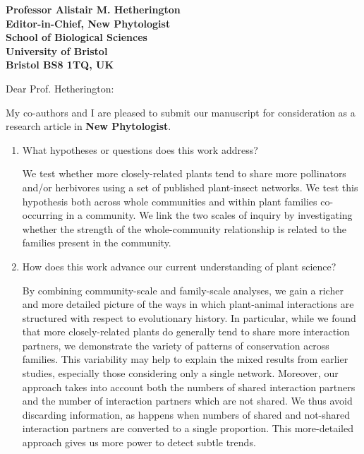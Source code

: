 \documentclass[12pt]{letter}
\begin{document}
\begin{letter}{\bf Professor Alistair M. Hetherington\\
               Editor-in-Chief, New Phytologist\\
               School of Biological Sciences\\
               University of Bristol\\
               Bristol BS8 1TQ, UK
                               }


\opening{Dear Prof. Hetherington:}


	My co-authors and I are pleased to submit our manuscript for consideration as a research article in \textbf{New Phytologist}. 

	\begin{enumerate}

	\item What hypotheses or questions does this work address?
		\smallskip


		We test whether	more closely-related plants tend to share more pollinators and/or herbivores using a set of published plant-insect networks. We test this hypothesis both across whole communities and within plant families co-occurring in a community. We link the two scales of inquiry by investigating whether the strength of the whole-community relationship is related to the families present in the community.

		\smallskip


		\item How does this work advance our current understanding of plant science?
		\smallskip 


		By combining community-scale and family-scale analyses, we gain a richer and more detailed picture of the ways in which plant-animal interactions are structured with respect to evolutionary history. In particular, while we found that more closely-related plants do generally tend to share more interaction partners, we demonstrate the variety of patterns of conservation across families. This variability may help to explain the mixed results from earlier studies, especially those considering only a single network. Moreover, our approach takes into account both the numbers of shared interaction partners and the number of interaction partners which are not shared. We thus avoid discarding information, as happens when numbers of shared and not-shared interaction partners are converted to a single proportion. This more-detailed approach gives us more power to detect subtle trends.


\end{enumerate}
\end{letter}
\end{document}

